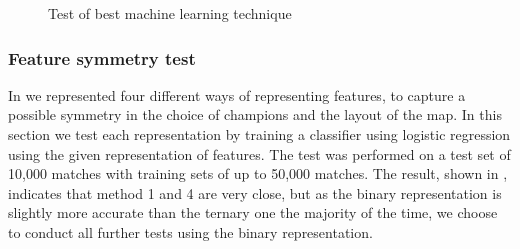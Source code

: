\begin{figure}[!htb]
  \caption{Test of best machine learning technique}\label{fig:besttech}
\end{figure}

\subsubsection{Feature symmetry test}
In  we represented four different ways of representing features, to capture a possible symmetry in the choice of champions and the layout of the map. In this section we test each representation by training a classifier using logistic regression using the given representation of features. The test was performed on a test set of 10,000 matches with training sets of up to 50,000 matches. The result, shown in , indicates that method 1 and 4 are very close, but as the binary representation is slightly more accurate than the ternary one the majority of the time, we choose to conduct all further tests using the binary representation. 

